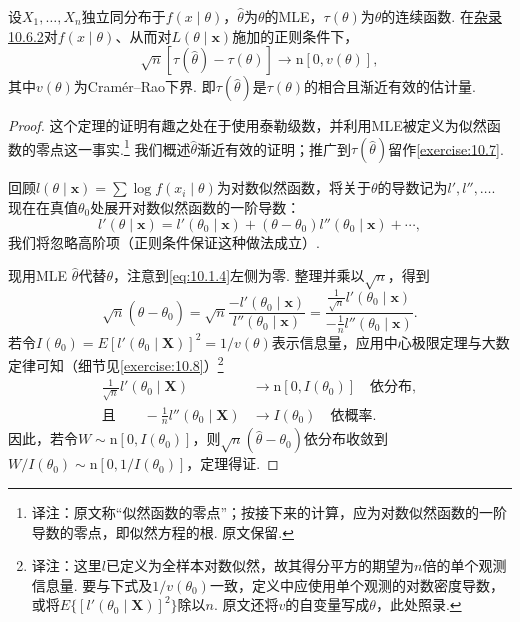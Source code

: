 \begin{theorem}[MLE的渐近有效性]\label{thm:10.1.12}
设$X_1,\ldots,X_n$独立同分布于$f(x\mid\theta)$，$\hat\theta$为$\theta$的MLE，$\tau(\theta)$为$\theta$的连续函数. 在\hyperref[sec:10.6.2]{杂录10.6.2}对$f(x\mid\theta)$、从而对$L(\theta\mid\boldsymbol x)$施加的正则条件下，
$$\sqrt n[\tau(\hat\theta)-\tau(\theta)]\longrightarrow\mathrm n[0,v(\theta)],$$
其中$v(\theta)$为Cramér--Rao下界. 即$\tau(\hat\theta)$是$\tau(\theta)$的相合且渐近有效的估计量.
\end{theorem}
\begin{proof}
这个定理的证明有趣之处在于使用泰勒级数，并利用MLE被定义为似然函数的零点这一事实.\footnote{译注：原文称“似然函数的零点”；按接下来的计算，应为对数似然函数的一阶导数的零点，即似然方程的根. 原文保留.} 我们概述$\hat\theta$渐近有效的证明；推广到$\tau(\hat\theta)$留作\autoref{exercise:10.7}.

回顾$l(\theta\mid\boldsymbol x)=\sum\log f(x_i\mid\theta)$为对数似然函数，将关于$\theta$的导数记为$l',l'',\ldots$. 现在在真值$\theta_0$处展开对数似然函数的一阶导数：
\begin{equation}\label{eq:10.1.4}
l'(\theta\mid\boldsymbol x)=l'(\theta_0\mid\boldsymbol x)+(\theta-\theta_0)l''(\theta_0\mid\boldsymbol x)+\cdots,
\end{equation}
我们将忽略高阶项（正则条件保证这种做法成立）.

现用MLE $\hat\theta$代替$\theta$，注意到\eqref{eq:10.1.4}左侧为零. 整理并乘以$\sqrt n$，得到
\begin{equation}\label{eq:10.1.5}
\sqrt n(\hat\theta-\theta_0)=\sqrt n\frac{-l'(\theta_0\mid\boldsymbol x)}{l''(\theta_0\mid\boldsymbol x)}
=\frac{\frac1{\sqrt n}l'(\theta_0\mid\boldsymbol x)}{-\frac1n l''(\theta_0\mid\boldsymbol x)}.
\end{equation}
若令$I(\theta_0)=E[l'(\theta_0\mid\boldsymbol X)]^2=1/v(\theta)$表示信息量，应用中心极限定理与大数定律可知（细节见\autoref{exercise:10.8}）\footnote{译注：这里$l$已定义为全样本对数似然，故其得分平方的期望为$n$倍的单个观测信息量. 要与下式及$1/v(\theta_0)$一致，定义中应使用单个观测的对数密度导数，或将$E\{[l'(\theta_0\mid\boldsymbol X)]^2\}$除以$n$. 原文还将$v$的自变量写成$\theta$，此处照录.}
\begin{equation}\label{eq:10.1.6}
\begin{aligned}
\frac1{\sqrt n}l'(\theta_0\mid\boldsymbol X)&\longrightarrow\mathrm n[0,I(\theta_0)]\quad\text{依分布},\\
\text{且}\qquad-\frac1n l''(\theta_0\mid\boldsymbol X)&\longrightarrow I(\theta_0)\quad\text{依概率}.
\end{aligned}
\end{equation}
因此，若令$W\sim\mathrm n[0,I(\theta_0)]$，则$\sqrt n(\hat\theta-\theta_0)$依分布收敛到$W/I(\theta_0)\sim\mathrm n[0,1/I(\theta_0)]$，定理得证.
\end{proof}

